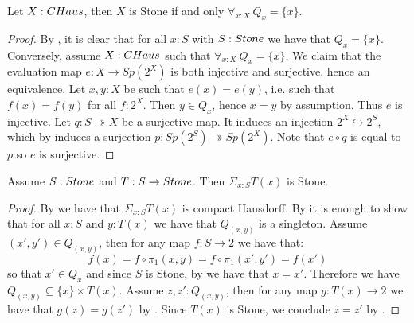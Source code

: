 \begin{lemma}\label{StoneCompactHausdorffTotallyDisconnected}
Let $X:\CHaus$, then $X$ is Stone if and only $\forall_{x:X}\ Q_x=\{x\}$.
\end{lemma}

\begin{proof}
  By , it is clear that for all $x:S$ with $S:\Stone$ we have that $Q_x=\{x\}$.
%
  Conversely, assume $X:\CHaus$ such that $\forall_{x:X}\ Q_x = \{x\}$.
  We claim that the evaluation map $e:X \to Sp(2^X)$ is both injective and surjective, hence an equivalence. 
    Let $x,y:X$ be such that $e(x)=e(y)$, i.e. such that $f(x) = f(y)$ for all $f:2^X$. Then $y \in Q_x$, hence $x=y$ by assumption. Thus $e$ is injective. 
    Let $q:S\twoheadrightarrow X$ be a surjective map. 
    It induces an injection $2^X \hookrightarrow 2^S$, which by 
    induces a surjection $p:Sp(2^S) \twoheadrightarrow Sp(2^X)$. 
    Note that $e\circ q$ is equal to $p$ so $e$ is surjective. 
%
%
%
\end{proof}

\begin{theorem}
  \label{stone-sigma-closed}
Assume $S:\Stone$ and $T:S\to\Stone$. Then $\Sigma_{x:S}T(x)$ is Stone.
\end{theorem}

\begin{proof}
By  we have that $\Sigma_{x:S}T(x)$ is compact Hausdorff. 
By  
it is enough to show that for all $x:S$ and $y:T(x)$ 
we have that $Q_{(x,y)}$ is a singleton.
%
Assume $(x',y')\in Q_{(x,y)}$, then for any map $f:S\to 2$ we have that:
$$ f(x) = f\circ \pi_1(x,y) = f\circ \pi_1(x',y') = f(x')$$
so that $x'\in Q_x$ and since $S$ is Stone, by  we have that $x=x'$.
%
Therefore we have $Q_{(x,y)}\subseteq \{x\}\times T(x)$. Assume $z,z':Q_{(x,y)}$, then for any map $g:T(x)\to 2$ we have that $g(z)=g(z')$ by . Since $T(x)$ is Stone, we conclude $z=z'$ by .
\end{proof}


